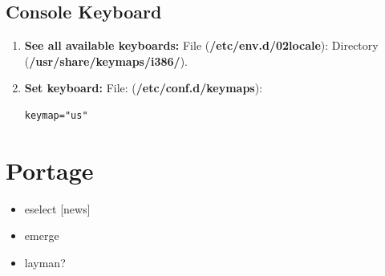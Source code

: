 \documentclass[10pt, a4paper, onecolumn, oneside, titlepage, openany]{book}
\begin{document}
\section{Console Keyboard}
\begin{enumerate}
    \item \textbf{See all available keyboards:}
\newline File (\textbf{\textcolor{file}{/etc/env.d/02locale}}):
\newline Directory (\textbf{\textcolor{dir}{/usr/share/keymaps/i386/}}).
    \item \textbf{Set keyboard:}
\newline File: (\textbf{\textcolor{file}{/etc/conf.d/keymaps}}):
\begin{verbatim}
keymap="us"
\end{verbatim}
\end{enumerate}

\chapter{Portage}
\begin{itemize}
    \item eselect [news]
    \item emerge
    \item layman?
\end{itemize}









\end{document}
